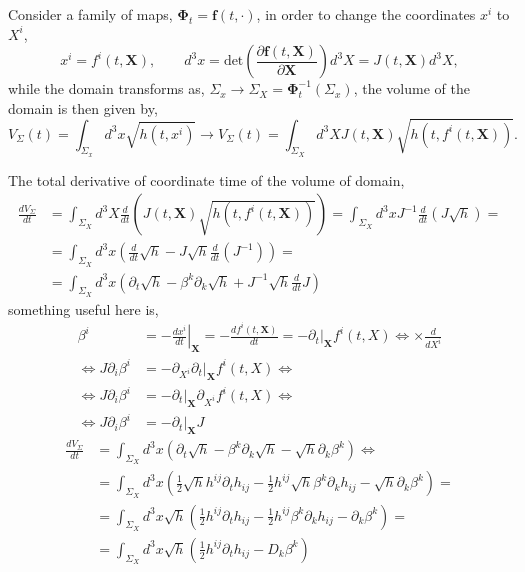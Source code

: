 Consider a family of maps, $\bm{\Phi}_t=\mathbf{f}(t,\cdot)$, in order to change the coordinates $x^i$ to $X^i$,
\begin{equation}
	x^i = f^i(t,\mathbf{X}), \qquad d^3x = \text{det}\left(\frac{\partial \mathbf{f}(t,\mathbf{X})}{\partial \mathbf{X}}\right)d^3X = J(t,\mathbf{X})d^3X,
\end{equation}
while the domain transforms as, $\Sigma_x \rightarrow \Sigma_X = \mathbf{\Phi}^{-1}_t(\Sigma_x)$, the volume of the domain is then given by,
\begin{equation}
	V_\Sigma(t)=\int_{\Sigma_x}d^3x \sqrt{h(t,x^i)} \rightarrow V_\Sigma(t)=\int_{\Sigma_X}d^3X J(t,\mathbf{X})\sqrt{h(t,f^i(t,\mathbf{X}))}.
\end{equation}

The total derivative of coordinate time of the volume of domain,
\begin{align}
	\frac{d V_\Sigma}{dt} &= \int_{\Sigma_X}d^3X  \frac{d}{dt}\left(J(t,\mathbf{X})\sqrt{h(t,f^i(t,\mathbf{X}))}\right)=\int_{\Sigma_X}d^3x J^{-1} \frac{d}{dt}\left(J \sqrt{h}\right)=\\
	&=\int_{\Sigma_X}d^3x \left(\frac{d}{dt}\sqrt{h} - J \sqrt{h} \frac{d}{dt}\left(J^{-1}\right)\right)=\\
	&=\int_{\Sigma_X}d^3x \left(\partial_t\sqrt{h}-\beta^k\partial_k \sqrt{h} + J^{-1} \sqrt{h} \frac{d}{dt}J\right)
\end{align}
something useful here is,
\begin{align}
	\beta^i&=-\left.\frac{dx^i}{dt}\right|_{\mathbf{X}}=-\frac{d f^i(t,\mathbf{X})}{dt}=-\partial_t|_{\mathbf{X}} f^i(t,X) \Leftrightarrow \times \frac{d}{dX^i}\\
	\Leftrightarrow J \partial_i \beta^i &=- \partial_{X^i} \partial_t|_{\mathbf{X}} f^i(t,X) \Leftrightarrow \\
	\Leftrightarrow J \partial_i \beta^i &=- \partial_t|_{\mathbf{X}}  \partial_{X^i} f^i(t,X)\Leftrightarrow \\
	\Leftrightarrow J \partial_i \beta^i &=- \partial_t|_{\mathbf{X}}  J
\end{align}
\begin{align}
	\frac{d V_\Sigma}{dt} &=\int_{\Sigma_X}d^3x \left(\partial_t\sqrt{h}-\beta^k\partial_k \sqrt{h} - \sqrt{h} \partial_k \beta^k\right)\Leftrightarrow\\
	&=\int_{\Sigma_X}d^3x \left(\frac{1}{2}\sqrt{h} h^{ij}\partial_t h_{ij}-\frac{1}{2} h^{ij}\sqrt{h}\beta^k\partial_k h_{ij} - \sqrt{h} \partial_k \beta^k\right)=\\
	&=\int_{\Sigma_X}d^3x \sqrt{h} \left(\frac{1}{2} h^{ij}\partial_t h_{ij}-\frac{1}{2} h^{ij}\beta^k\partial_k h_{ij} - \partial_k \beta^k\right)=\\
	&=\int_{\Sigma_X}d^3x \sqrt{h} \left(\frac{1}{2} h^{ij}\partial_t h_{ij}-D_k\beta^k\right)
\end{align}
